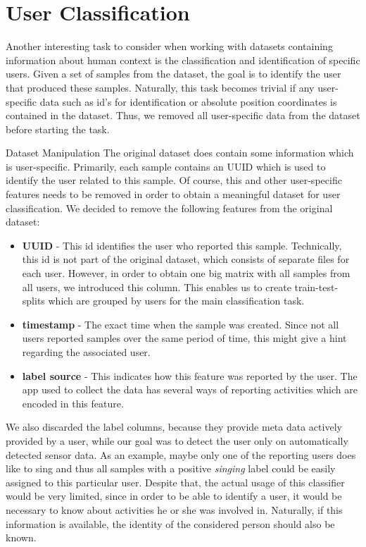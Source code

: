 \section{User Classification}\label{sec:user_classification}
Another interesting task to consider when working with datasets containing information about human context is the classification and identification of specific users. Given a set of samples from the dataset, the goal is to identify the user that produced these samples. Naturally, this task becomes trivial if any user-specific data such as id's for identification or absolute position coordinates is contained in the dataset. Thus, we removed all user-specific data from the dataset before starting the task.

\begin{subsection}{Dataset Manipulation}
	The original dataset does contain some information which is user-specific. Primarily, each sample contains an UUID which is used to identify the user related to this sample. Of course, this and other user-specific features needs to be removed in order to obtain a meaningful dataset for user classification. We decided to remove the following features from the original dataset:
	\begin{itemize}
		\item \textbf{UUID} - This id identifies the user who reported this sample. Technically, this id is not part of the original dataset, which consists of separate files for each user. However, in order to obtain one big matrix with all samples from all users, we introduced this column. This enables us to create train-test-splits which are grouped by users for the main classification task.
		\item \textbf{timestamp} - The exact time when the sample was created. Since not all users reported samples over the same period of time, this might give a hint regarding the associated user.
		\item \textbf{label source} - This indicates how this feature was reported by the user. The app used to collect the data has several ways of reporting activities which are encoded in this feature.
	\end{itemize}
	We also discarded the label columns, because they provide meta data actively provided by a user, while our goal was to detect the user only on automatically detected sensor data. As an example, maybe only one of the reporting users does like to sing and thus all samples with a positive \emph{singing} label could be easily assigned to this particular user. Despite that, the actual usage of this classifier would be very limited, since in order to be able to identify a user, it would be necessary to know about activities he or she was involved in. Naturally, if this information is available, the identity of the considered person should also be known.
\end{subsection}
